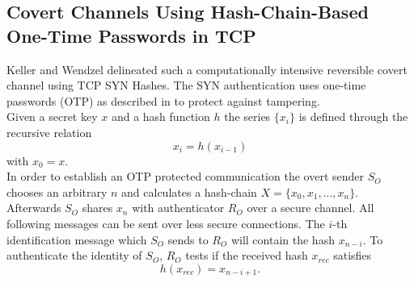 \documentclass[12pt,a4paper,automark, toc=bib]{scrreprt}
\theoremstyle{definition}
\begin{document}
			\subsection{Covert Channels Using Hash-Chain-Based One-Time Passwords in TCP}
			Keller and Wendzel  \cite{Keller2021} delineated such a computationally intensive reversible covert channel using TCP SYN Hashes. The SYN authentication uses one-time passwords (OTP) as described in  \cite{Lamport} to protect against tampering. \\
			Given a secret key $x$ and a hash function $h$ the series $\{x_i\}$ is defined through the recursive relation 
			\begin{equation}
				x_i = h(x_{i-1})
			\end{equation} 
			with $x_0 = x$.\\
			In order to establish an OTP protected communication the overt sender $S_O$ chooses an arbitrary $n$ and calculates a hash-chain $X = \{ x_0, x_1, ..., x_n\}$. Afterwards $S_O$ shares $x_n$ with authenticator $R_O$ over a secure channel. All following messages can be sent over less secure connections. The $i$-th identification message which $S_O$ sends to $R_O$ will contain the hash $x_{n-i}$. To authenticate the identity of $S_O$, $R_O$ tests if the received hash $x_{rec}$ satisfies \begin{equation}
				h(x_{rec}) = x_{n-i+1}.
			\end{equation} 
			
\end{document}
